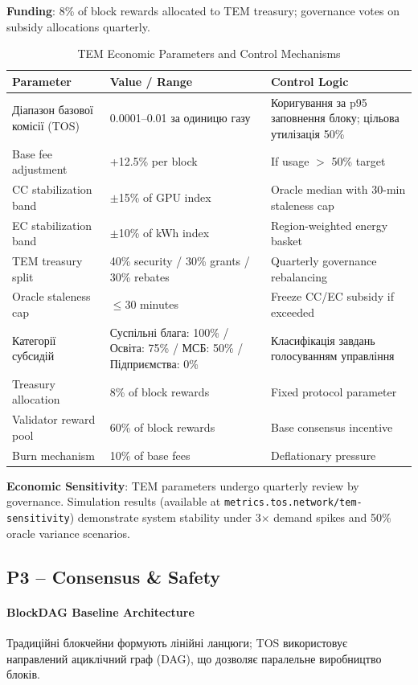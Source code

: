 \documentclass[11pt]{article}
\begin{document}
\textbf{Funding}: 8\% of block rewards allocated to TEM treasury; governance votes on subsidy allocations quarterly.

\begin{table}[H]
\centering
\caption{TEM Economic Parameters and Control Mechanisms}
\label{tab:tem-parameters}
\begin{tabular}{@{}p{}p{}p{}@{}}
\toprule
\textbf{Parameter} & \textbf{Value / Range} & \textbf{Control Logic} \\ \midrule
Діапазон базової комісії (TOS) & 0.0001--0.01 за одиницю газу & Коригування за p95 заповнення блоку; цільова утилізація 50\% \\
Base fee adjustment & +12.5\% per block & If usage $>$ 50\% target \\
CC stabilization band & $\pm$15\% of GPU index & Oracle median with 30-min staleness cap \\
EC stabilization band & $\pm$10\% of kWh index & Region-weighted energy basket \\
TEM treasury split & 40\% security / 30\% grants / 30\% rebates & Quarterly governance rebalancing \\
Oracle staleness cap & $\le$30 minutes & Freeze CC/EC subsidy if exceeded \\
Категорії субсидій & Суспільні блага: 100\% / Освіта: 75\% / МСБ: 50\% / Підприємства: 0\% & Класифікація завдань голосуванням управління \\
Treasury allocation & 8\% of block rewards & Fixed protocol parameter \\
Validator reward pool & 60\% of block rewards & Base consensus incentive \\
Burn mechanism & 10\% of base fees & Deflationary pressure \\
\bottomrule
\end{tabular}
\end{table}

\textbf{Economic Sensitivity}: TEM parameters undergo quarterly review by governance. Simulation results (available at \texttt{metrics.tos.network/tem-sensitivity}) demonstrate system stability under 3$\times$ demand spikes and 50\% oracle variance scenarios.

\subsection{P3 -- Consensus \& Safety}
\label{sec:pillar-consensus}

\paragraph{BlockDAG Baseline Architecture}
Традиційні блокчейни формують лінійні ланцюги; TOS використовує направлений ациклічний граф (DAG), що дозволяє паралельне виробництво блоків.
\end{document}
